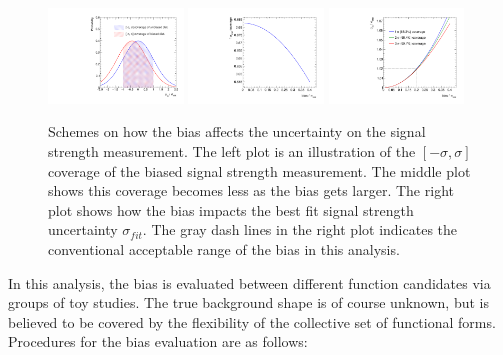 \begin{figure}[!htb]
  \centering
  \captionsetup{justification=justified}
  \includegraphics[width=0.32\textwidth]{pics/VH_sec/bias_derivation/coverage_scheme.pdf}
  \includegraphics[width=0.32\textwidth]{pics/VH_sec/bias_derivation/coverage_1sigma.pdf}
  \includegraphics[width=0.32\textwidth]{pics/VH_sec/bias_derivation/sigma_fit.pdf}
  \caption{Schemes on how the bias affects the uncertainty on the signal strength measurement.
           The left plot is an illustration of the $[-\sigma, \sigma]$ coverage of the biased signal strength measurement.
           The middle plot shows this coverage becomes less as the bias gets larger.
           The right plot shows how the bias impacts the best fit signal strength uncertainty $\sigma_{fit}$.
           The gray dash lines in the right plot indicates the conventional acceptable range of the bias in this analysis.}
  \label{fig:bias_derivation}
\end{figure}

In this analysis, the bias is evaluated between different function candidates via groups of toy studies.
The true background shape is of course unknown, but is believed to be covered by the flexibility of the collective set of functional forms.
Procedures for the bias evaluation are as follows:

